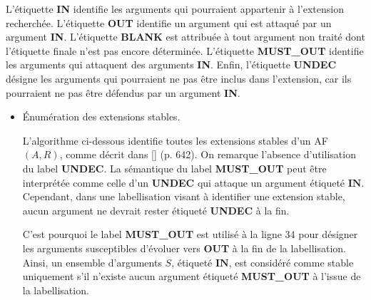 \documentclass{rapportECL}
\begin{document}
L'étiquette \textbf{IN} identifie les arguments qui pourraient appartenir à  l'extension recherchée. L'étiquette \textbf{OUT} 
identifie un argument qui est attaqué par un argument \textbf{IN}. L'étiquette \textbf{BLANK} est attribuée à tout argument non 
traité dont l'étiquette finale n'est pas encore déterminée. L'étiquette \textbf{ {MUST\_OUT}} identifie les arguments qui attaquent des 
arguments \textbf{IN}. Enfin, l'étiquette \textbf{UNDEC} désigne les arguments qui pourraient ne pas être inclus dans  l'extension, car ils pourraient ne pas être défendus par un argument \textbf{IN}.


\begin{itemize}
    \item Énumération des extensions stables.
    
	L'algorithme ci-dessous identifie toutes les extensions stables d’un AF $(A, R)$, comme décrit dans [] (p. 642). %
	On remarque l'absence d'utilisation du label \textbf{UNDEC}. La sémantique du label \textbf{MUST\_OUT} peut être interprétée comme celle 
	d'un \textbf{UNDEC} qui attaque un argument étiqueté \(\textbf{IN}\). 
	Cependant, dans une labellisation visant à identifier une extension stable, aucun argument ne devrait rester étiqueté \textbf{UNDEC} à 
	la fin. 

	C'est pourquoi le label \textbf{MUST\_OUT} est utilisé à la ligne 34 pour désigner les arguments susceptibles d'évoluer 
	vers \textbf{OUT} à la fin de la labellisation. Ainsi, un ensemble d'arguments \( S \), étiqueté \(\textbf{IN}\), est 
	considéré comme stable uniquement s'il n'existe aucun argument étiqueté \textbf{MUST\_OUT} à l'issue de la labellisation.


\end{itemize}
\end{document}
